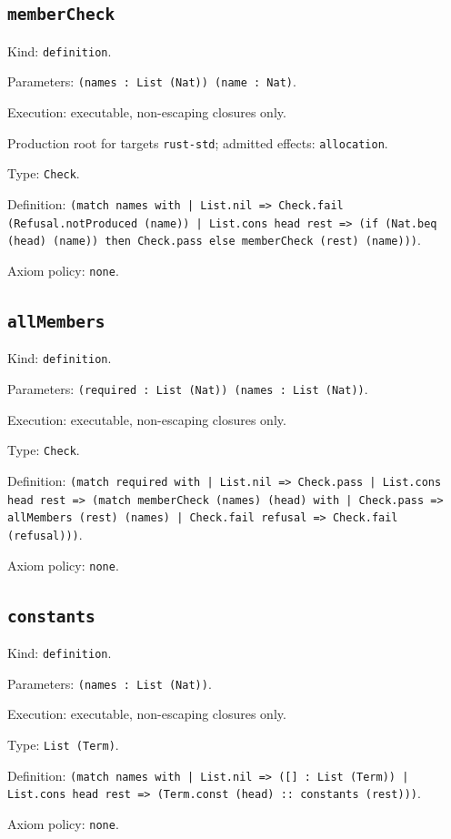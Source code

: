 \documentclass[11pt]{article}
\begin{document}
\subsection*{\texttt{memberCheck}}
\noindent Kind: \texttt{definition}.\par
\noindent Parameters: \texttt{(names : List (Nat)) (name : Nat)}.\par
\noindent Execution: executable, non-escaping closures only.\par
\noindent Production root for targets \texttt{rust-std}; admitted effects: \texttt{allocation}.\par
\noindent Type: \texttt{Check}.\par
\noindent Definition: \texttt{(match names with | List.nil => Check.fail (Refusal.notProduced (name)) | List.cons head rest => (if (Nat.beq (head) (name)) then Check.pass else memberCheck (rest) (name)))}.\par
\noindent Axiom policy: \texttt{none}.\par
\subsection*{\texttt{allMembers}}
\noindent Kind: \texttt{definition}.\par
\noindent Parameters: \texttt{(required : List (Nat)) (names : List (Nat))}.\par
\noindent Execution: executable, non-escaping closures only.\par
\noindent Type: \texttt{Check}.\par
\noindent Definition: \texttt{(match required with | List.nil => Check.pass | List.cons head rest => (match memberCheck (names) (head) with | Check.pass => allMembers (rest) (names) | Check.fail refusal => Check.fail (refusal)))}.\par
\noindent Axiom policy: \texttt{none}.\par
\subsection*{\texttt{constants}}
\noindent Kind: \texttt{definition}.\par
\noindent Parameters: \texttt{(names : List (Nat))}.\par
\noindent Execution: executable, non-escaping closures only.\par
\noindent Type: \texttt{List (Term)}.\par
\noindent Definition: \texttt{(match names with | List.nil => ([] : List (Term)) | List.cons head rest => (Term.const (head) :: constants (rest)))}.\par
\noindent Axiom policy: \texttt{none}.\par
\end{document}
